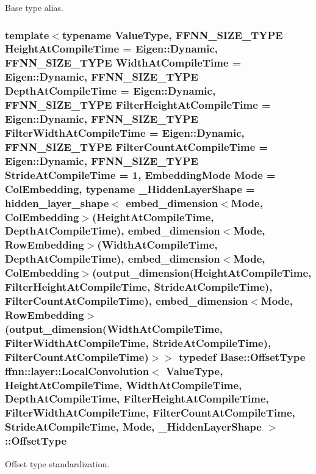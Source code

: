 Base type alias. 

\hypertarget{classffnn_1_1layer_1_1_local_convolution_ade49c152e28ac5dd35427569ccbc332e}{
\subsubsection[{Offset\-Type}]{\setlength{\rightskip}{0pt plus 5cm}template$<$typename Value\-Type, F\-F\-N\-N\-\_\-\-S\-I\-Z\-E\-\_\-\-T\-Y\-P\-E Height\-At\-Compile\-Time = Eigen\-::\-Dynamic, F\-F\-N\-N\-\_\-\-S\-I\-Z\-E\-\_\-\-T\-Y\-P\-E Width\-At\-Compile\-Time = Eigen\-::\-Dynamic, F\-F\-N\-N\-\_\-\-S\-I\-Z\-E\-\_\-\-T\-Y\-P\-E Depth\-At\-Compile\-Time = Eigen\-::\-Dynamic, F\-F\-N\-N\-\_\-\-S\-I\-Z\-E\-\_\-\-T\-Y\-P\-E Filter\-Height\-At\-Compile\-Time = Eigen\-::\-Dynamic, F\-F\-N\-N\-\_\-\-S\-I\-Z\-E\-\_\-\-T\-Y\-P\-E Filter\-Width\-At\-Compile\-Time = Eigen\-::\-Dynamic, F\-F\-N\-N\-\_\-\-S\-I\-Z\-E\-\_\-\-T\-Y\-P\-E Filter\-Count\-At\-Compile\-Time = Eigen\-::\-Dynamic, F\-F\-N\-N\-\_\-\-S\-I\-Z\-E\-\_\-\-T\-Y\-P\-E Stride\-At\-Compile\-Time = 1, Embedding\-Mode Mode = Col\-Embedding, typename \-\_\-\-Hidden\-Layer\-Shape = hidden\-\_\-layer\-\_\-shape$<$              embed\-\_\-dimension$<$\-Mode, Col\-Embedding$>$(\-Height\-At\-Compile\-Time, Depth\-At\-Compile\-Time),              embed\-\_\-dimension$<$\-Mode, Row\-Embedding$>$(\-Width\-At\-Compile\-Time,  Depth\-At\-Compile\-Time),              embed\-\_\-dimension$<$\-Mode, Col\-Embedding$>$(output\-\_\-dimension(\-Height\-At\-Compile\-Time, Filter\-Height\-At\-Compile\-Time, Stride\-At\-Compile\-Time), Filter\-Count\-At\-Compile\-Time),              embed\-\_\-dimension$<$\-Mode, Row\-Embedding$>$(output\-\_\-dimension(\-Width\-At\-Compile\-Time,  Filter\-Width\-At\-Compile\-Time,  Stride\-At\-Compile\-Time), Filter\-Count\-At\-Compile\-Time)$>$$>$ typedef {\bf Base\-::\-Offset\-Type} {\bf ffnn\-::layer\-::\-Local\-Convolution}$<$ Value\-Type, Height\-At\-Compile\-Time, Width\-At\-Compile\-Time, Depth\-At\-Compile\-Time, Filter\-Height\-At\-Compile\-Time, Filter\-Width\-At\-Compile\-Time, Filter\-Count\-At\-Compile\-Time, Stride\-At\-Compile\-Time, Mode, \-\_\-\-Hidden\-Layer\-Shape $>$\-::{\bf Offset\-Type}}}\label{classffnn_1_1layer_1_1_local_convolution_ade49c152e28ac5dd35427569ccbc332e}


Offset type standardization. 

